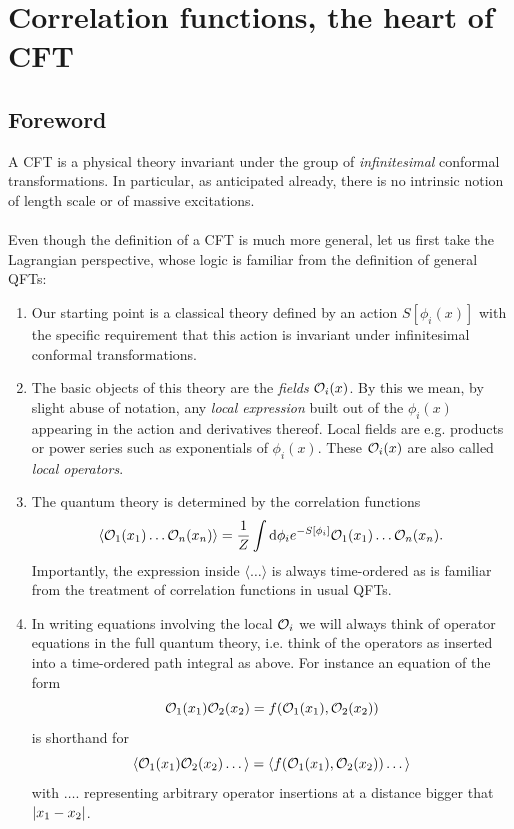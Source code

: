 \section{Correlation functions, the heart of CFT}
\subsection{Foreword}

A CFT is a physical theory invariant under the group of \emph{infinitesimal} conformal transformations.
In particular, as anticipated already, there is no intrinsic notion of length scale or of massive excitations.\\
\\
Even though the definition of a CFT is much more general, let us first take the Lagrangian
perspective, whose logic is familiar from the definition of general QFTs:
\begin{enumerate} 
	\item  Our starting point is a classical theory defined by an action $S[\phi_i(x)]$ with the specific
	requirement that this action is invariant under infinitesimal conformal transformations.
	\item  The basic objects of this theory are the \emph{fields} $\mathcal{O}_i(x)$. By this we mean, by slight abuse of
	notation, any \emph{local expression} built out of the $\phi_i(x)$  appearing in the action and derivatives
	thereof. Local fields are e.g. products or power series such as exponentials of $\phi_i(x)$. These $\mathcal{O}_i(x)$ are also called \emph{ local operators}.
	\item  The quantum theory is determined by the correlation functions
	\begin{equation}
	\langle \mathcal{O}_1(x_1) \dots \mathcal{O}_n(x_n) \rangle = \frac{1}{Z} \int \mathrm{d} \phi_i e^{- S[\phi_i]} \mathcal{O}_1(x_1) \dots \mathcal{O}_n(x_n).
	\end{equation}
	Importantly, the expression inside $\langle \dots \rangle$ is always time-ordered as is familiar from the treatment of correlation functions in usual QFTs.
	\item  In writing equations involving the local $\mathcal{O}_i$ we will always think of operator equations in
	the full quantum theory, i.e. think of the operators as inserted into a time-ordered path
	integral as above. For instance an equation of the form
	\begin{equation}
	\mathcal{O}_1(x_1) \mathcal{O}_2(x_2) = f(\mathcal{O}_1(x_1),\mathcal{O}_2(x_2)) 
	\end{equation}
	is shorthand for
	\begin{equation}
	\label{eq:ct1}
	\langle \mathcal{O}_1(x_1) \mathcal{O}_2(x_2) \dots \rangle = \langle f(\mathcal{O}_1(x_1),\mathcal{O}_2(x_2))\dots \rangle
	\end{equation}
	with $\dots$. representing arbitrary operator insertions at a distance bigger that $\abs{x_1-x_2}$.
	
\end{enumerate}

